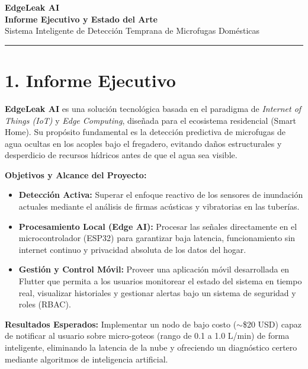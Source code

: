 \documentclass[11pt,a4paper]{article}
\begin{document}
\begin{center}
    {\Huge \textbf{\textcolor{primary}{EdgeLeak AI}}}\\[0.5cm]
    {\LARGE \textbf{Informe Ejecutivo y Estado del Arte}}\\[0.3cm]
    {\large Sistema Inteligente de Detección Temprana de Microfugas Domésticas}\\[0.5cm]
    \rule{\textwidth}{0.4pt}
\end{center}
\vspace{0.5cm}

\section*{1. Informe Ejecutivo}

\textbf{EdgeLeak AI} es una solución tecnológica basada en el paradigma de \textit{Internet of Things (IoT)} y \textit{Edge Computing}, diseñada para el ecosistema residencial (Smart Home). Su propósito fundamental es la detección predictiva de microfugas de agua ocultas en los acoples bajo el fregadero, evitando daños estructurales y desperdicio de recursos hídricos antes de que el agua sea visible.

\vspace{0.3cm}
\noindent\textbf{Objetivos y Alcance del Proyecto:}
\begin{itemize}[label=\textcolor{primary}{\textbullet}]
    \item \textbf{Detección Activa:} Superar el enfoque reactivo de los sensores de inundación actuales mediante el análisis de firmas acústicas y vibratorias en las tuberías.
    \item \textbf{Procesamiento Local (Edge AI):} Procesar las señales directamente en el microcontrolador (ESP32) para garantizar baja latencia, funcionamiento sin internet continuo y privacidad absoluta de los datos del hogar.
    \item \textbf{Gestión y Control Móvil:} Proveer una aplicación móvil desarrollada en Flutter que permita a los usuarios monitorear el estado del sistema en tiempo real, visualizar historiales y gestionar alertas bajo un sistema de seguridad y roles (RBAC).
\end{itemize}

\vspace{0.3cm}
\noindent\textbf{Resultados Esperados:}
Implementar un nodo de bajo costo ($\sim$\$20 USD) capaz de notificar al usuario sobre micro-goteos (rango de 0.1 a 1.0 L/min) de forma inteligente, eliminando la latencia de la nube y ofreciendo un diagnóstico certero mediante algoritmos de inteligencia artificial.
\end{document}
